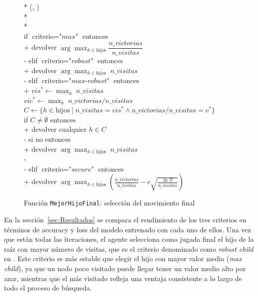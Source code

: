 \documentclass[conference,a4paper]{IEEEtran}
\begin{document}
\begin{itemize}
  \begin{figure}
\begin{pseudo}*
  (, ) \\*
   \\*
   \\
  if \( \text{criterio} = \textit{"max"} \) entonces \\+
    devolver \( \arg\max_{h \in \text{hijos}} \dfrac{n\_victorias}{n\_visitas} \) \\-
  elif \( \text{criterio} = \textit{"robust"} \) entonces \\+
    devolver \( \arg\max_{h \in \text{hijos}} \; n\_visitas \) \\-
  elif \( \text{criterio} = \textit{"max-robust"} \) entonces \\+
    \( vis^* \leftarrow \max_{h} \; n\_visitas \) \\
    \( vic^* \leftarrow \max_{h} \; n\_victorias / n\_visitas \) \\
    \( C \leftarrow \{ h \in \text{hijos} \mid n\_visitas = vis^* \wedge n\_victorias / n\_visitas = v^* \} \) \\
    if \( C \neq \emptyset \) entonces \\+
      devolver cualquier \( h \in C \) \\-
    si no entonces \\+
      devolver \( \arg\max_{h \in \text{hijos}} \; n\_visitas \) \\-\\-
  elif \( \text{criterio} = \textit{"secure"} \) entonces \\+
    devolver \( \displaystyle\arg\max_{h \in \text{hijos}}
      \left( \frac{n\_victorias}{n\_visitas} - c\sqrt{\frac{\ln N}{n\_visitas}} \right) \)
\end{pseudo}
\caption{Función \texttt{MejorHijoFinal}: selección del movimiento final}
\label{pcd:mejorHijoFinal}
\end{figure}
\end{itemize}

En la sección~\ref{sec:Resultados} se compara el rendimiento de los tres
criterios en términos de accuracy y loss del modelo entrenado con cada uno
de ellos.
Una vez que están todas las iteraciones, el agente selecciona como jugada 
final el hijo de la raíz con mayor número de visitas, que es el criterio denominado como \textit{robust child} en \cite{b2}. Este criterio es más estable que elegir el hijo con mayor valor medio (\textit{max child}), ya que un nodo poco visitado puede llegar tener un valor medio alto por azar, mientras que el más visitado refleja una ventaja consistente a lo largo de todo el proceso de búsqueda.
\end{document}
